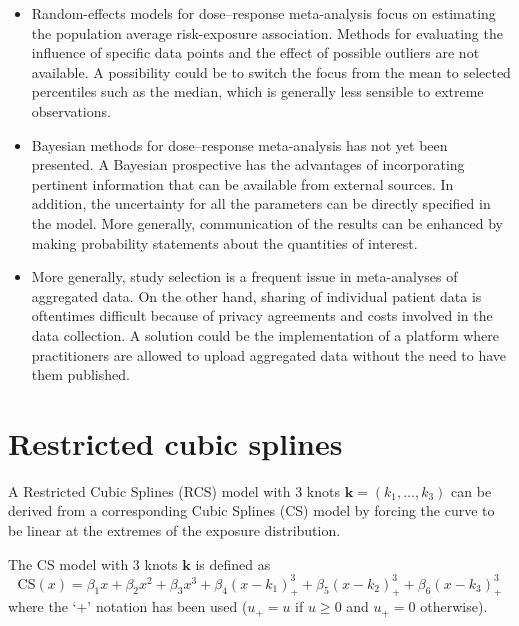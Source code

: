 \documentclass[11pt,a4paper,twoside,openany]{book}\usepackage{knitr}
\begin{document}
{\begin{itemize}
\item Random-effects models for dose--response meta-analysis focus on estimating the population average risk-exposure association. Methods for evaluating the influence of specific data points and the effect of possible outliers are not available. A possibility could be to switch the focus from the mean to selected percentiles such as the median, which is generally less sensible to extreme observations.

\item Bayesian methods for dose--response meta-analysis has not yet been presented. A Bayesian prospective has the advantages of incorporating pertinent information that can be available from external sources. In addition, the uncertainty for all the parameters can be directly specified in the model. More generally, communication of the results can be enhanced by making probability statements about the quantities of interest.

\item More generally, study selection is a frequent issue in meta-analyses of aggregated data. On the other hand, sharing of individual patient data is oftentimes difficult because of privacy agreements and costs involved in the data collection. A solution could be the implementation of a platform where practitioners are allowed to upload aggregated data without the need to have them published.

\end{itemize}

\appendix


%

\chapter{Restricted cubic splines}\label{sec:rcs}

A Restricted Cubic Splines (RCS) model with 3 knots $\mathbf{k} = \left(k_1, \dots, k_3\right)$ can be derived from a corresponding Cubic Splines (CS) model by forcing the curve to be linear at the extremes of the exposure distribution.

\noindent The CS model with 3 knots $\mathbf{k}$ is defined as  
\begin{equation}
\mathrm{CS}(x) = \beta_1 x + \beta_2x^2 + \beta_3x^3 + \beta_4\left(x - k_1 \right)_{+}^3 + \beta_5\left( x - k_2\right)_{+}^3 + \beta_6\left( x - k_3\right)_{+}^3
\label{eq:csa}
\end{equation}
\noindent where the `+' notation has been used ($u_+ = u$ if $u \ge 0$ and $u_+ = 0$ otherwise).

}
\end{document}
